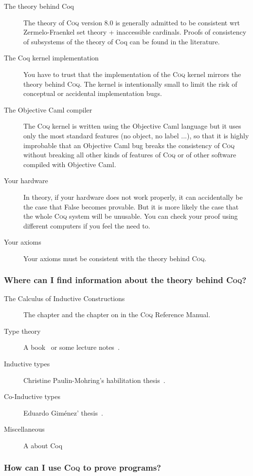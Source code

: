 \documentclass[a4paper,pdftex]{article}
\def\Question#1{\stepcounter{question}\subsubsection{#1}}
\def\Coq{\textsc{Coq}}
\begin{document}
\begin{description}
\item[The theory behind Coq] The theory of {\Coq} version 8.0 is
generally admitted to be consistent wrt Zermelo-Fraenkel set theory +
inaccessible cardinals. Proofs of consistency of subsystems of the
theory of Coq can be found in the literature.
\item[The Coq kernel implementation] You have to trust that the
implementation of the {\Coq} kernel mirrors the theory behind {\Coq}. The
kernel is intentionally small to limit the risk of conceptual or
accidental implementation bugs.
\item[The Objective Caml compiler] The {\Coq} kernel is written using the
Objective Caml language but it uses only the most standard features
(no object, no label ...), so that it is highly improbable that an
Objective Caml bug breaks the consistency of {\Coq} without breaking all
other kinds of features of {\Coq} or of other software compiled with
Objective Caml.
\item[Your hardware] In theory, if your hardware does not work
properly, it can accidentally be the case that False becomes
provable. But it is more likely the case that the whole {\Coq} system
will be unusable. You can check your proof using different computers
if you feel the need to.
\item[Your axioms] Your axioms must be consistent with the theory
behind {\Coq}.
\end{description}


\Question{Where can I find information about the theory behind {\Coq}?}
\begin{description}
\item[The Calculus of Inductive Constructions] The
chapter and the chapter on
 in
the {\Coq} Reference Manual.
\item[Type theory] A book~\cite{ProofsTypes} or some lecture
notes~\cite{Types:Dowek}.
\item[Inductive types]
Christine Paulin-Mohring's habilitation thesis~\cite{Pau96b}.
\item[Co-Inductive types]
Eduardo Giménez' thesis~\cite{EGThese}.
\item[Miscellaneous] A
 about Coq
\end{description}


\Question{How can I use {\Coq} to prove programs?}
\end{document}
